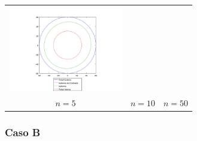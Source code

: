 {\begin{tabular}{ccc}
              \includegraphics[width=5cm]{graficos/exp4/seno/exp4-seno-ang-50-iso.png} \\
              {\small $n = 5$} &
              {\small $n = 10$} &
              {\small $n = 50$} \\
            \end{tabular}}

        \subsubsection*{Caso B}
